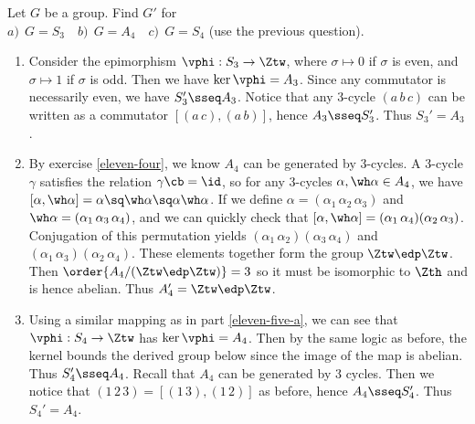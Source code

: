 \documentclass{article}
\begin{document}
\begin{exercise}
  Let \( G \) be a group.
  Find \( G' \) for \\
  \( a)\ \ G = S_3 \quad b)\ \ G = A_4 \quad c)\ \ G = S_4 \) (use the previous question).
\end{exercise}
\begin{solution}
\begin{enumerate}[label=(\alph*)]
  \item Consider the epimorphism \( \vphi:S_3\to \Ztw \), where \( \sigma\mapsto 0 \) if \( \sigma \) is even, and \( \sigma\mapsto 1 \) if \( \sigma \) is odd. \label{eleven-five-a}
  Then we have \( \ker\vphi = A_3 \).
  Since any commutator is necessarily even, we have \( S_3'\sseq A_3 \).
  Notice that any 3-cycle \( (a\,b\,c) \) can be written as a commutator \( [(a\,c),(a\,b)] \), hence \( A_3 \sseq S_3'\).
  Thus \( S_3' = A_3 \).

  \item By exercise \ref{eleven-four}, we know \( A_4 \) can be generated by 3-cycles.
   A 3-cycle \( \gamma \) satisfies the relation \( \gamma\cb = \id \), so for any 3-cycles \( \alpha,\wh\alpha\in A_4 \), we have \( [\alpha,\wh\alpha] = \alpha\sq\wh\alpha\sq\alpha\wh\alpha \).
  If we define \( \alpha = (\alpha_1\, \alpha_2\, \alpha_3) \) and \( \wh\alpha = (\alpha_1\, \alpha_3\, \alpha_4) \), and we can quickly check that \( [\alpha,\wh\alpha] = (\alpha_1\,\alpha_4)(\alpha_2\,\alpha_3) \).
  Conjugation of this permutation yields \( (\alpha_1\,\alpha_2)(\alpha_3\,\alpha_4) \) and \( (\alpha_1\,\alpha_3)(\alpha_2\,\alpha_4) \).
  These elements together form the group \( \Ztw\edp\Ztw \).
  Then \( \order{A_4/(\Ztw\edp\Ztw)} = 3 \) so it must be isomorphic to \( \Zth \) and is hence abelian.
  Thus \( A_4' = \Ztw\edp\Ztw \).

  \item Using a similar mapping as in part \ref{eleven-five-a}, we can see that \( \vphi:S_4\to \Ztw \) has \( \ker\vphi = A_4 \).
  Then by the same logic as before, the kernel bounds the derived group below since the image of the map is abelian.
  Thus \( S_4'\sseq A_4 \).
  Recall that \( A_4 \) can be generated by 3 cycles.
  Then we notice that \( (1\,2\,3) = [(1\,3),(1\,2)] \) as before, hence \( A_4\sseq S_4' \).
  Thus \( S_4'=A_4 \).

\end{enumerate}
\end{solution}
\end{document}
